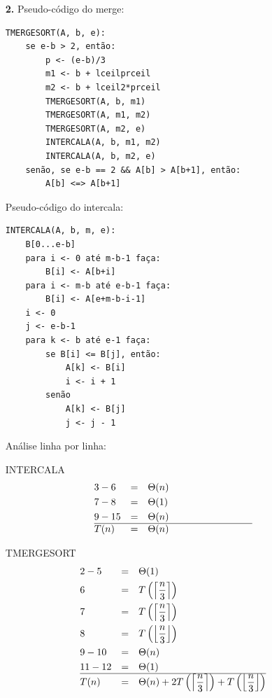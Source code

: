 \documentclass[12pt, a4paper]{article} %
\begin{document}
\begin{enumerate}
\item[\textbf{2.}]
Pseudo-código do merge:
\begin{lstlisting}
TMERGESORT(A, b, e):
    se e-b > 2, então:
        p <- (e-b)/3
        m1 <- b + lceilprceil
        m2 <- b + lceil2*prceil
        TMERGESORT(A, b, m1)
        TMERGESORT(A, m1, m2)
        TMERGESORT(A, m2, e)
        INTERCALA(A, b, m1, m2)
        INTERCALA(A, b, m2, e)
    senão, se e-b == 2 && A[b] > A[b+1], então:
        A[b] <=> A[b+1]
\end{lstlisting}
Pseudo-código do intercala:
\begin{lstlisting}
INTERCALA(A, b, m, e):
    B[0...e-b]
    para i <- 0 até m-b-1 faça:
        B[i] <- A[b+i]
    para i <- m-b até e-b-1 faça:
        B[i] <- A[e+m-b-i-1]
    i <- 0
    j <- e-b-1
    para k <- b até e-1 faça:
        se B[i] <= B[j], então:
            A[k] <- B[i]
            i <- i + 1
        senão
            A[k] <- B[j]
            j <- j - 1
\end{lstlisting}
Análise linha por linha:\\
\begin{minipage}{0.45\textwidth}
INTERCALA
\begin{align*}
&3-6  &= \quad &\Theta(n)\\
&7-8  &= \quad &\Theta(1)\\
&9-15 &= \quad &\Theta(n)\\
\hline
&T(n) &= \quad &\Theta(n) \hspace{3cm}
\end{align*}
\end{minipage}
\hfill
\begin{minipage}{0.45\textwidth}
TMERGESORT
\begin{align*}
&2-5   &= \quad &\Theta(1)\\
&6     &= \quad &T\left(\Big\lceil \frac{n}{3} \Big\rceil\right)\\
&7     &= \quad &T\left(\Big\lceil \frac{n}{3} \Big\rceil\right)\\
&8     &= \quad &T\left(\Big\lfloor \frac{n}{3} \Big\rfloor\right)\\
&9-10  &= \quad &\Theta(n)\\
&11-12 &= \quad &\Theta(1)\\
\hline
&T(n) &= \quad &\Theta(n) + 2T\left(\Big\lceil \frac{n}{3} \Big\rceil\right) + T\left(\Big\lfloor \frac{n}{3} \Big\rfloor\right)\\
\end{align*}
\end{minipage}

\end{enumerate}
\end{document}
